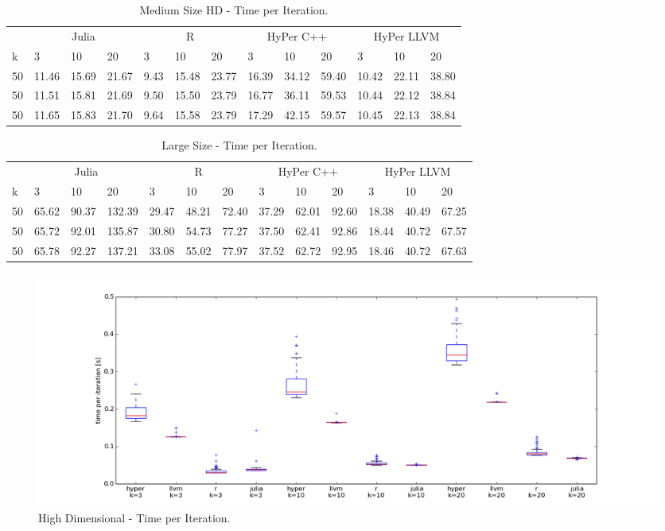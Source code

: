 \begin{table}[htsb]
  \caption[Medium Size HD - Time per Iteration]{Medium Size HD - Time per Iteration.}
  \label{tab:medium_hd_all}
  \centering
  \begin{tabular}{l l l l l l l l l l l l l}
    \toprule
      & \multicolumn{3}{c}{Julia} & \multicolumn{3}{c}{R} & \multicolumn{3}{c}{HyPer C++} & \multicolumn{3}{c}{HyPer LLVM}  \\
      k & 3 & 10 & 20 & 3 & 10 & 20 & 3 & 10 & 20 & 3 & 10 & 20 \\
    \midrule
      50  & 11.46 & 15.69 & 21.67 & 9.43 & 15.48 & 23.77 & 16.39 & 34.12 & 59.40 & 10.42 & 22.11 & 38.80 \\
      50  & 11.51 & 15.81 & 21.69 & 9.50 & 15.50 & 23.79 & 16.77 & 36.11 & 59.53 & 10.44 & 22.12 & 38.84 \\
      50  & 11.65 & 15.83 & 21.70 & 9.64 & 15.58 & 23.79 & 17.29 & 42.15 & 59.57 & 10.45 & 22.13 & 38.84 \\
    \bottomrule
  \end{tabular}
\end{table}



\begin{table}[htsb]
  \caption[Large Size - Time per Iteration]{Large Size - Time per Iteration.}
  \label{tab:network_all}
  \centering
  \begin{tabular}{l l l l l l l l l l l l l}
    \toprule
      & \multicolumn{3}{c}{Julia} & \multicolumn{3}{c}{R} & \multicolumn{3}{c}{HyPer C++} & \multicolumn{3}{c}{HyPer LLVM}  \\
      k & 3 & 10 & 20 & 3 & 10 & 20 & 3 & 10 & 20 & 3 & 10 & 20 \\
    \midrule
      50  & 65.62 & 90.37 & 132.39 & 29.47 & 48.21 & 72.40 & 37.29 & 62.01 & 92.60 & 18.38 & 40.49 & 67.25 \\
      50  & 65.72 & 92.01 & 135.87 & 30.80 & 54.73 & 77.27 & 37.50 & 62.41 & 92.86 & 18.44 & 40.72 & 67.57 \\
      50  & 65.78 & 92.27 & 137.21 & 33.08 & 55.02 & 77.97 & 37.52 & 62.72 & 92.95 & 18.46 & 40.72 & 67.63 \\
    \bottomrule
  \end{tabular}
\end{table}




\begin{figure}[htsb]
  \raggedleft
  \includegraphics[scale=0.4, trim="0cm 1cm 0cm 0cm"]{figures/charts/50000_all}
  \caption[High Dimensional - Time per Iteration]{High Dimensional - Time per Iteration.}
  \label{fig:50000_all}
\end{figure}


